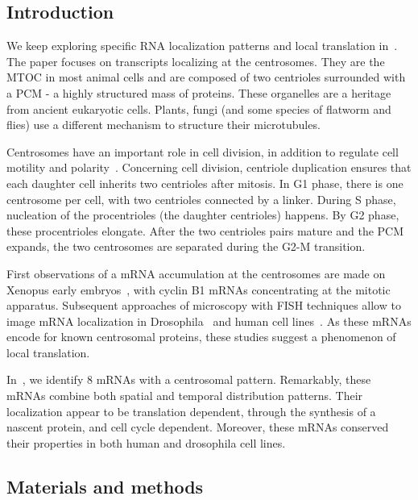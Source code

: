 \subsection{Introduction}
\label{subsec:introduction_centrosomal}

We keep exploring specific \ac{RNA} localization patterns and local translation in~\cite{safieddine_choreography_2021}.
The paper focuses on transcripts localizing at the centrosomes.
They are the \ac{MTOC} in most animal cells and are composed of two centrioles surrounded with a \ac{PCM} - a highly structured mass of proteins.
These organelles are a heritage from ancient eukaryotic cells.
Plants, fungi (and some species of flatworm and flies) use a different mechanism to structure their microtubules.

Centrosomes have an important role in cell division, in addition to regulate cell motility and polarity~\cite{wu_2017}.
Concerning cell division, centriole duplication ensures that each daughter cell inherits two centrioles after mitosis.
In G1 phase, there is one centrosome per cell, with two centrioles connected by a linker.
During S phase, nucleation of the procentrioles (the daughter centrioles) happens.
By G2 phase, these procentrioles elongate.
After the two centrioles pairs mature and the \ac{PCM} expands, the two centrosomes are separated during the G2-M transition.

First observations of a \ac{mRNA} accumulation at the centrosomes are made on Xenopus early embryos~\cite{Groisman_2000}, with cyclin B1 \ac{mRNA}s concentrating at the mitotic apparatus.
Subsequent approaches of microscopy with \ac{FISH} techniques allow to image \ac{mRNA} localization in Drosophila~\cite{lecuyer_global_2007, wilk_diverse_2016} and human cell lines~\cite{Sepulveda_2018, CHOUAIB_2020}.
As these \ac{mRNA}s encode for known centrosomal proteins, these studies suggest a phenomenon of local translation.

In~\cite{safieddine_choreography_2021}, we identify 8 \ac{mRNA}s with a centrosomal pattern.
Remarkably, these \ac{mRNA}s combine both spatial and temporal distribution patterns.
Their localization appear to be translation dependent, through the synthesis of a nascent protein, and cell cycle dependent.
Moreover, these \ac{mRNA}s conserved their properties in both human and drosophila cell lines.

\subsection{Materials and methods}
\label{subsec:materials_centrosomal}

